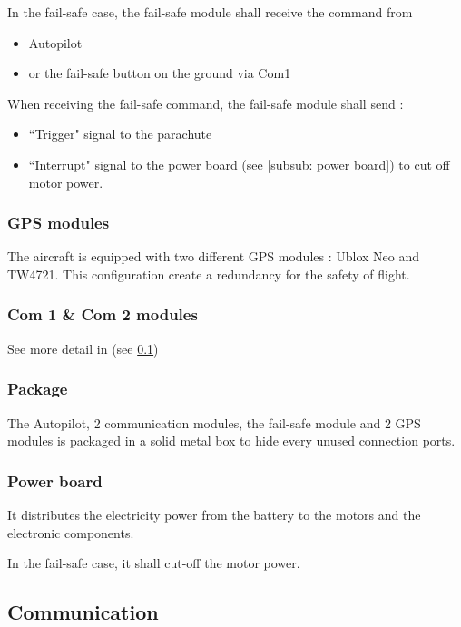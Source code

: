 \documentclass[]{article}
\begin{document}
In the fail-safe case, the fail-safe module shall receive the command from
\begin{itemize}
	\item Autopilot
	\item or the fail-safe button on the ground via Com1
\end{itemize}

When receiving the fail-safe command, the fail-safe module shall send :
\begin{itemize}
	\item ``Trigger" signal to the parachute 
	\item ``Interrupt" signal to the power board (see \ref{subsub: power board}) to cut off motor power.
\end{itemize}

\subsubsection{GPS modules}
The aircraft is equipped with two different GPS modules : Ublox Neo and TW4721. This configuration create a redundancy for the safety of flight.

\subsubsection{ Com 1 \& Com 2 modules}
See more detail in (see \ref{sub:com})



\subsubsection {Package}
The Autopilot,  2 communication modules, the fail-safe module and 2 GPS modules is packaged in a solid metal box to hide every unused connection ports.

\subsubsection{Power board}
It distributes the electricity power from the battery to the motors and the electronic components.

In the fail-safe case, it shall cut-off the motor power.

\subsection{Communication} \label{sub:com}
\end{document}

